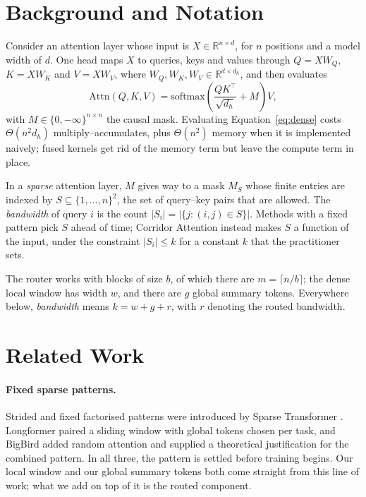 \documentclass[11pt]{article}
\begin{document}
\section{Background and Notation}\label{sec:background}

Consider an attention layer whose input is $X \in \mathbb{R}^{n \times d}$,
for $n$ positions and a model width of $d$. One head maps $X$ to queries,
keys and values through $Q = XW_Q$, $K = XW_K$ and $V = XW_V$, where
$W_Q, W_K, W_V \in \mathbb{R}^{d \times d_h}$, and then evaluates
\begin{equation}\label{eq:dense}
  \mathrm{Attn}(Q, K, V) = \mathrm{softmax}\!\left(
    \frac{QK^{\top}}{\sqrt{d_h}} + M \right) V,
\end{equation}
with $M \in \{0, -\infty\}^{n \times n}$ the causal mask. Evaluating
Equation~\eqref{eq:dense} costs $\Theta(n^2 d_h)$ multiply--accumulates, plus
$\Theta(n^2)$ memory when it is implemented naively; fused kernels
\citep{dao2022flashattention} get rid of the memory term but leave the
compute term in place.

In a \emph{sparse} attention layer, $M$ gives way to a mask $M_S$ whose
finite entries are indexed by $S \subseteq \{1,\dots,n\}^2$, the set of
query--key pairs that are allowed. The \emph{bandwidth} of query $i$ is the
count $|S_i| = |\{j : (i,j) \in S\}|$. Methods with a fixed pattern pick $S$
ahead of time; Corridor Attention instead makes $S$ a function of the input,
under the constraint $|S_i| \le k$ for a constant $k$ that the practitioner
sets.

The router works with blocks of size $b$, of which there are
$m = \lceil n/b \rceil$; the dense local window has width $w$, and there are
$g$ global summary tokens. Everywhere below, \emph{bandwidth} means
$k = w + g + r$, with $r$ denoting the routed bandwidth.

\section{Related Work}\label{sec:related}

\paragraph{Fixed sparse patterns.} Strided and fixed factorised patterns were
introduced by Sparse Transformer \citep{child2019sparse}. Longformer
\citep{beltagy2020longformer} paired a sliding window with global tokens
chosen per task, and BigBird \citep{zaheer2020bigbird} added random
attention and supplied a theoretical justification for the combined pattern.
In all three, the pattern is settled before training begins. Our local
window and our global summary tokens both come straight from this line of
work; what we add on top of it is the routed component.
\end{document}
